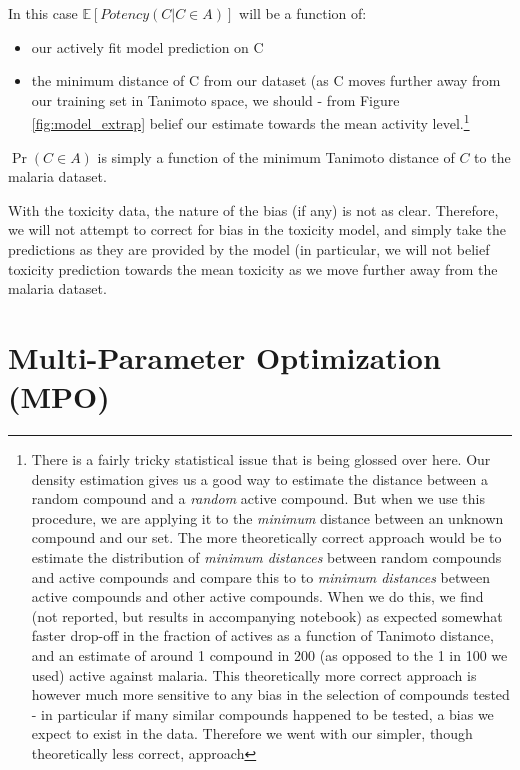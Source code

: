\documentclass{article}
\begin{document}
In this case $\mathbb{E}[Potency(C | C \in A)]$ will be a function of: \begin{itemize}
    \item our actively fit model prediction on C
    \item the minimum distance of C from our dataset (as C moves further away from our training set in Tanimoto space, we should - from Figure \ref{fig:model_extrap} belief our estimate towards the mean activity level.\footnote{There is a fairly tricky statistical issue that is being glossed over here.  Our density estimation gives us a good way to estimate the distance between a random compound and a \textit{random} active compound.  But when we use this procedure, we are applying it to the \textit{minimum} distance between an unknown compound and our set.  The more theoretically correct approach would be to estimate the distribution of \textit{minimum distances} between random compounds and active compounds and compare this to to \textit{minimum distances} between active compounds and other active compounds.  When we do this, we find (not reported, but results in accompanying notebook) as expected somewhat faster drop-off in the fraction of actives as a function of Tanimoto distance, and an estimate of around 1 compound in 200 (as opposed to the 1 in 100 we used) active against malaria.  This theoretically more correct approach is however much more sensitive to any bias in the selection of compounds tested - in particular if many similar compounds happened to be tested, a bias we expect to exist in the data.  Therefore we went with our simpler, though theoretically less correct, approach}
\end{itemize}

$\Pr(C \in A)$ is simply a function of the minimum Tanimoto distance of $C$ to the malaria dataset.


With the toxicity data, the nature of the bias (if any) is not as clear.  Therefore, we will not attempt to correct for bias in the toxicity model, and simply take the predictions as they are provided by the model (in particular, we will not belief toxicity prediction towards the mean toxicity as we move further away from the malaria dataset.


\section{Multi-Parameter Optimization (MPO)}
\end{document}
